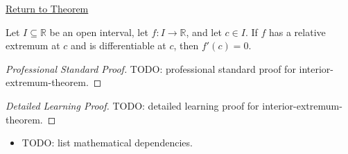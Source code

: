 \newpage
{}
\label{prf:interior-extremum-theorem}

\begin{remark*}[Return]
\hyperref[thm:interior-extremum-theorem]{Return to Theorem}
\end{remark*}

\begin{theorem*}
Let $I \subseteq \mathbb{R}$ be an open interval, let $f : I \to \mathbb{R}$, and let $c \in I$. If $f$ has a relative extremum at $c$ and is differentiable at $c$, then $f'(c) = 0$.
\end{theorem*}

\begin{proof}[Professional Standard Proof]
\LRAProofBodyStart
TODO: professional standard proof for interior-extremum-theorem.
\end{proof}

\begin{proof}[Detailed Learning Proof]
\LRAProofBodyStart
TODO: detailed learning proof for interior-extremum-theorem.
\end{proof}

\begin{remark*}
\end{remark*}

\begin{dependencies}
\begin{itemize}
  \item TODO: list mathematical dependencies.
\end{itemize}
\end{dependencies}

\clearpage
